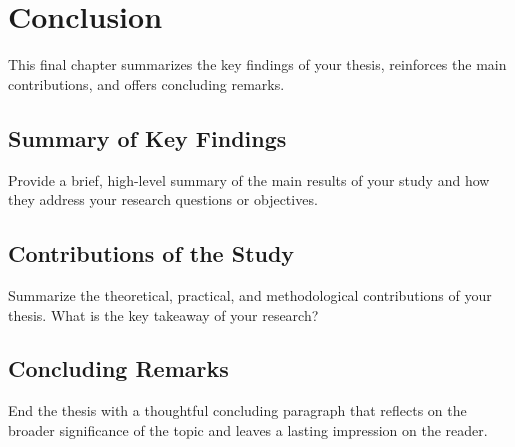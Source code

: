 
\section{Conclusion}

This final chapter summarizes the key findings of your thesis, reinforces the main contributions, and offers concluding remarks.

\subsection{Summary of Key Findings}
Provide a brief, high-level summary of the main results of your study and how they address your research questions or objectives.

\subsection{Contributions of the Study}
Summarize the theoretical, practical, and methodological contributions of your thesis. What is the key takeaway of your research?

\subsection{Concluding Remarks}
End the thesis with a thoughtful concluding paragraph that reflects on the broader significance of the topic and leaves a lasting impression on the reader.
